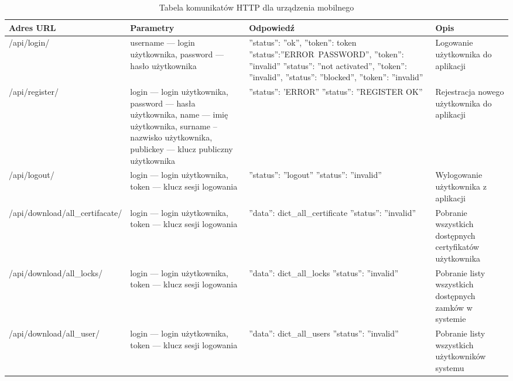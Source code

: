 \begin{landscape}
	\begin{longtable}[!ht]{|m{5cm}|m{5cm}|m{4.7cm}|m{4cm}|} 
		\caption{Tabela komunikatów HTTP dla urządzenia mobilnego}
		\label{tab:http_mobilne}\\
		\hline	
		Adres URL & Parametry & Odpowiedź & Opis \\	\hline
		/api/login/ & username --- login użytkownika, \newline password --- hasło użytkownika & ''status'': ''ok'', ''token'': token \tablinia ''status'':''ERROR~\mbox{PASSWORD}'', ''token'': ''invalid'' \tablinia ''status'': ''not activated'', \newline ''token'': ''invalid'', \tablinia ''status'': ''blocked'', \newline''token'': ''invalid'' & Logowanie użytkownika do aplikacji \\ \hline
		/api/register/ & login --- login użytkownika, \newline password --- hasła użytkownika, \newline name --- imię użytkownika, \newline surname -- nazwisko użytkownika, \newline publickey --- klucz publiczny użytkownika & ''status'': 'ERROR'' \tablinia ''status'': ''REGISTER OK'' & Rejestracja nowego użytkownika do aplikacji \\ \hline
		/api/logout/ & login --- login użytkownika, \newline token --- klucz sesji logowania & ''status'': ''logout'' \tablinia ''status'': ''invalid'' & Wylogowanie użytkownika z aplikacji \\ \hline
		/api/download/all\_certifacate/ & login --- login użytkownika, \newline token --- klucz sesji logowania & ''data'': dict\_all\_certificate \tablinia ''status'': ''invalid'' & Pobranie wszystkich dostępnych certyfikatów użytkownika \\ \hline
		/api/download/all\_locks/ & login --- login użytkownika, \newline token --- klucz sesji logowania & ''data'': dict\_all\_locks \tablinia ''status'': ''invalid'' & Pobranie listy wszystkich dostępnych zamków w systemie \\ \hline
		/api/download/all\_user/ & login --- login użytkownika, \newline token --- klucz sesji logowania & ''data'': dict\_all\_users \tablinia ''status'': ''invalid'' & Pobranie listy wszystkich użytkowników systemu \\ \hline

\end{longtable}
\end{landscape}
